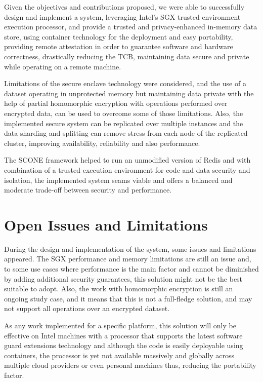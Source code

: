 Given the objectives and contributions proposed, we were able to successfully design and implement a system, leveraging Intel's \gls{SGX} trusted environment execution processor, and provide a trusted and privacy-enhanced in-memory data store, using container technology for the deployment and easy portability, providing remote attestation in order to guarantee software and hardware correctness, drastically reducing the \gls{TCB}, maintaining data secure and private while operating on a remote machine.

Limitations of the secure enclave technology were considered, and the use of a dataset operating in unprotected memory but maintaining data private with the help of partial homomorphic encryption with operations performed over encrypted data, can be used to overcome some of those limitations. Also, the implemented secure system can be replicated over multiple instances and the data sharding and splitting can remove stress from each node of the replicated cluster, improving availability, reliability and also performance.

The SCONE framework helped to run an unmodified version of Redis and with combination of a trusted execution environment for code and data security and isolation, the implemented system seams viable and offers a balanced and moderate trade-off between security and performance.

\section{Open Issues and Limitations}
\label{sec:open_issues_and_limitations}

During the design and implementation of the system, some issues and limitations appeared. The \gls{SGX} performance and memory limitations are still an issue and, to some use cases where performance is the main factor and cannot be diminished by adding additional security guarantees, this solution might not be the best suitable to adopt. Also, the work with homomorphic encryption is still an ongoing study case, and it means that this is not a full-fledge solution, and may not support all operations over an encrypted dataset.

As any work implemented for a specific platform, this solution will only be effective on Intel machines with a processor that supports the latest software guard extensions technology and although the code is easily deployable using containers, the processor is yet not available massively and globally across multiple cloud providers or even personal machines thus, reducing the portability factor. 

